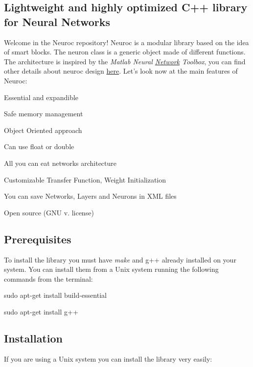 \subsection*{Lightweight and highly optimized C++ library for Neural Networks }

Welcome in the Neuroc repository! Neuroc is a modular library based on the idea of smart blocks. The neuron class is a generic object made of different functions. The architecture is inspired by the {\itshape Matlab Neural \hyperlink{class_network}{Network} Toolbox}, you can find other details about neuroc design \hyperlink{md__a_r_c_h_i_t_e_c_t_u_r_e}{here}. Let's look now at the main features of Neuroc\-:


\begin{DoxyItemize}
\item Essential and expandible
\item Safe memory management
\item Object Oriented approach
\item Can use float or double
\item All you can eat networks architecture
\item Customizable Transfer Function, Weight Initialization
\item You can save Networks, Layers and Neurons in X\-M\-L files
\item Open source (G\-N\-U v. license)
\end{DoxyItemize}

\subsection*{Prerequisites }

To install the library you must have {\itshape make} and g++ already installed on your system. You can install them from a Unix system running the following commands from the terminal\-:

{\ttfamily sudo apt-\/get install build-\/essential}

{\ttfamily sudo apt-\/get install g++}

\subsection*{Installation }

If you are using a Unix system you can install the library very easily\-:


